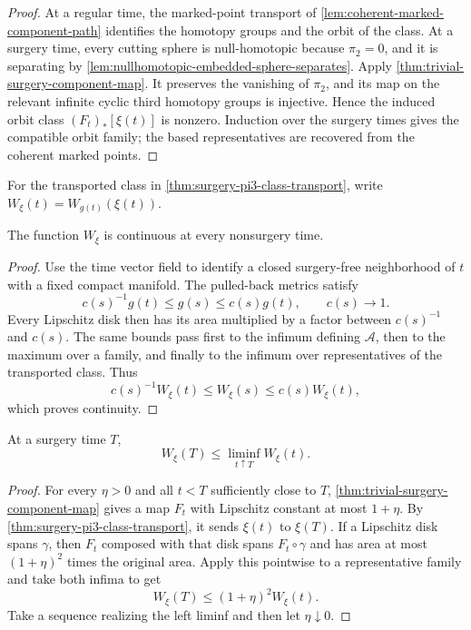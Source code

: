 \begin{proof}
At a regular time, the marked-point transport of
\ref{lem:coherent-marked-component-path} identifies the homotopy groups and
the orbit of the class.  At a surgery time, every cutting sphere is
null-homotopic because
$\pi_2=0$, and it is separating by
\ref{lem:nullhomotopic-embedded-sphere-separates}.  Apply
\ref{thm:trivial-surgery-component-map}.  It preserves the
vanishing of $\pi_2$, and its map on the relevant infinite cyclic third
homotopy groups is injective.  Hence the induced orbit class
$(F_t)_*[\xi(t)]$ is nonzero.  Induction over the surgery times gives the
compatible orbit family; the based representatives are recovered from the
coherent marked points.
\end{proof}

For the transported class in \ref{thm:surgery-pi3-class-transport}, write
$W_\xi(t)=W_{g(t)}(\xi(t))$.

\begin{lemma}
\label{lem:loop-width-regular-continuity}
\notready
The function $W_\xi$ is continuous at every nonsurgery time.
\end{lemma}

\begin{proof}
Use the time vector field to identify a closed surgery-free neighborhood of
$t$ with a fixed compact manifold.  The pulled-back metrics satisfy
\[
 c(s)^{-1}g(t)\le g(s)\le c(s)g(t),
 \qquad c(s)\longrightarrow1.
\]
Every Lipschitz disk then has its area multiplied by a factor between
$c(s)^{-1}$ and $c(s)$.  The same bounds pass first to the infimum defining
$\mathcal A$, then to the maximum over a family, and finally to the infimum
over representatives of the transported class.  Thus
\[
 c(s)^{-1}W_\xi(t)\le W_\xi(s)\le c(s)W_\xi(t),
\]
which proves continuity.
\end{proof}

\begin{lemma}
\label{lem:loop-width-surgery-lower-semicontinuity}
\notready
At a surgery time $T$,
\[
 W_\xi(T)\le\liminf_{t\uparrow T}W_\xi(t).
\]
\end{lemma}

\begin{proof}
For every $\eta>0$ and all $t<T$ sufficiently close to $T$,
\ref{thm:trivial-surgery-component-map} gives a map $F_t$ with Lipschitz
constant at most $1+\eta$.  By
\ref{thm:surgery-pi3-class-transport}, it sends $\xi(t)$ to $\xi(T)$.  If a
Lipschitz disk spans $\gamma$, then $F_t$ composed with that disk spans
$F_t\circ\gamma$ and has area at most $(1+\eta)^2$ times the original area.
Apply this pointwise to a representative family and take both infima to get
\[
 W_\xi(T)\le(1+\eta)^2W_\xi(t).
\]
Take a sequence realizing the left liminf and then let $\eta\downarrow0$.
\end{proof}

